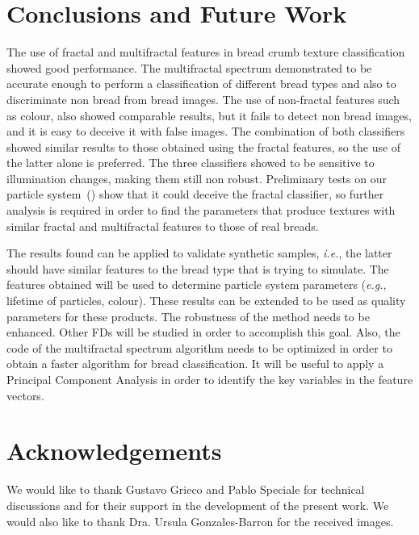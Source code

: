 \documentclass[oneside,a4paper,english,links]{amca}
\begin{document}
\section{Conclusions and Future Work}
The use of fractal and multifractal features in bread crumb texture classification showed good performance. The multifractal spectrum demonstrated to be accurate enough to perform a classification of different bread types and also to discriminate non bread from bread images. The use of non-fractal features such as colour, also showed comparable results, but it fails to detect non bread images, and it is easy to deceive it with false images. The combination of both classifiers showed similar results to those obtained using the fractal features, so the use of the latter alone is preferred. The three classifiers showed to be sensitive to illumination changes, making them still non robust. Preliminary tests on our particle system~(\cite{Baravalle2011}) show that it could deceive the fractal classifier, so further analysis is required in order to find the parameters that produce textures with similar fractal and multifractal features to those of real breads.

The results found can be applied to validate synthetic samples, {\em i.e.}, the latter should have similar features to the bread type that is trying to simulate. The features obtained will be used to determine particle system parameters ({\em e.g.}, lifetime of particles, colour). These results can be extended to be used as quality parameters for these products. The robustness of the method needs to be enhanced. Other FDs will be studied in order to accomplish this goal. Also, the code of the multifractal spectrum algorithm needs to be optimized in order to obtain a faster algorithm for bread classification. It will be useful to apply a Principal Component Analysis in order to identify the key variables in the feature vectors. 

\section{Acknowledgements}
We would like to thank Gustavo Grieco and Pablo Speciale for technical discussions and for their support in the development of the present work. We would also like to thank Dra. Ursula Gonzales-Barron for the received images.

%

\end{document}
